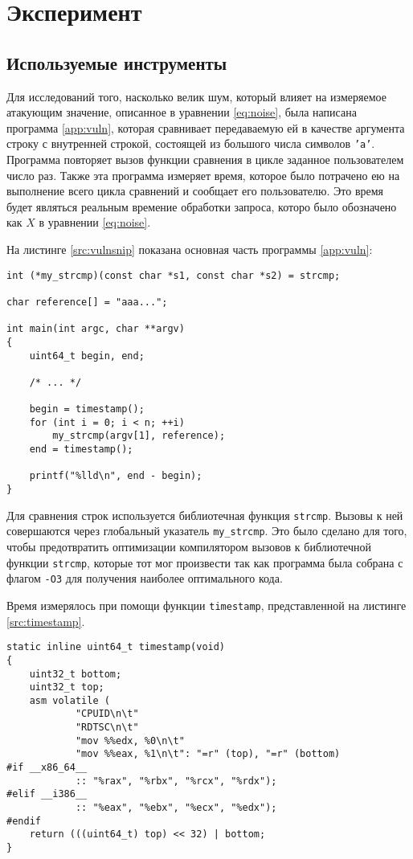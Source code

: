 \section{Эксперимент}

\subsection{Используемые инструменты}

Для исследований того, насколько велик шум, который влияет на измеряемое атакующим значение,
описанное в уравнении \ref{eq:noise}, была написана программа \ref{app:vuln}, которая сравнивает
передаваемую ей в качестве аргумента строку с внутренней строкой, состоящей из большого числа
символов \texttt{'a'}. Программа повторяет вызов функции сравнения в цикле заданное
пользователем число раз. Также эта программа измеряет время, которое было потрачено ею
на выполнение всего цикла сравнений и сообщает его пользователю. Это время будет являться
реальным времение обработки запроса, которо было обозначено как $X$ в уравнении \ref{eq:noise}.

На листинге \ref{src:vulnsnip} показана основная часть программы \ref{app:vuln}:

\begin{lstlisting}[caption=Отрывок программы \texttt{vulnerable.c}, label=src:vulnsnip]
int (*my_strcmp)(const char *s1, const char *s2) = strcmp;

char reference[] = "aaa...";

int main(int argc, char **argv)
{
	uint64_t begin, end;

	/* ... */

	begin = timestamp();
	for (int i = 0; i < n; ++i)
		my_strcmp(argv[1], reference);
	end = timestamp();

	printf("%lld\n", end - begin);
}
\end{lstlisting}

Для сравнения строк используется библиотечная функция \texttt{strcmp}. Вызовы к ней совершаются
через глобальный указатель \texttt{my\_strcmp}. Это было сделано для того, чтобы предотвратить оптимизации
компилятором вызовов к библиотечной функции \texttt{strcmp}, которые тот мог произвести так как программа
была собрана с флагом \texttt{-O3} для получения наиболее оптимального кода.

Время измерялось при помощи функции \texttt{timestamp}, представленной на листинге
\ref{src:timestamp}.

\begin{lstlisting}[caption=Функция \texttt{timestamp}, label=src:timestamp]
static inline uint64_t timestamp(void)
{
	uint32_t bottom;
	uint32_t top;
	asm volatile (
			"CPUID\n\t"
			"RDTSC\n\t"
			"mov %%edx, %0\n\t"
			"mov %%eax, %1\n\t": "=r" (top), "=r" (bottom)
#if __x86_64__
			:: "%rax", "%rbx", "%rcx", "%rdx");
#elif __i386__
			:: "%eax", "%ebx", "%ecx", "%edx");
#endif
	return (((uint64_t) top) << 32) | bottom;
}
\end{lstlisting}

